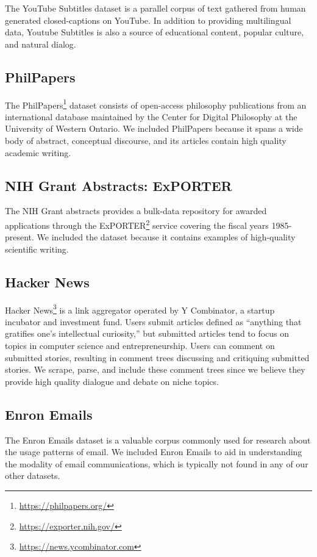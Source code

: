 The YouTube Subtitles dataset is a parallel corpus of text gathered from human generated closed-captions on YouTube. In addition to providing multilingual data, Youtube Subtitles is also a source of educational content, popular culture, and natural dialog.

\subsection{PhilPapers}

The PhilPapers\footnote{\url{https://philpapers.org/}} dataset consists of open-access philosophy publications from an international database maintained by the Center for Digital Philosophy at the University of Western Ontario. We included PhilPapers because it spans a wide body of abstract, conceptual discourse, and its articles contain high quality academic writing.

\subsection{NIH Grant Abstracts: ExPORTER}

The NIH Grant abstracts provides a bulk-data repository for awarded applications through the {ExPORTER}\footnote{\url{https://exporter.nih.gov/}} service covering the fiscal years 1985-present. We included the dataset because it contains examples of high-quality scientific writing.

\subsection{Hacker News} Hacker News\footnote{\url{https://news.ycombinator.com}} is a link aggregator operated by Y Combinator, a startup incubator and investment fund. Users submit articles defined as ``anything that gratifies one's intellectual curiosity,'' but submitted articles tend to focus on topics in computer science and entrepreneurship. Users can comment on submitted stories, resulting in comment trees discussing and critiquing submitted stories. We scrape, parse, and include these comment trees since we believe they provide high quality dialogue and debate on niche topics. 

\subsection{Enron Emails}

The Enron Emails dataset \citep{Enron} is a valuable corpus commonly used for research about the usage patterns of email. We included Enron Emails to aid in understanding the modality of email communications, which is typically not found in any of our other datasets.

